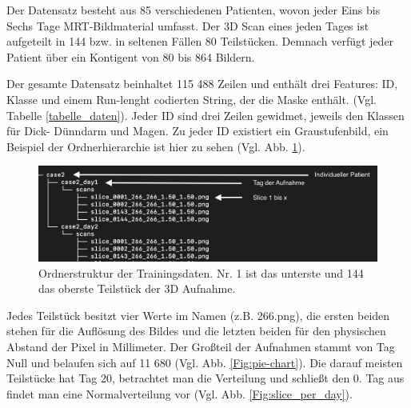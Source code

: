 Der Datensatz besteht aus 85 verschiedenen Patienten, wovon jeder Eins bis Sechs Tage MRT-Bildmaterial umfasst. Der 3D Scan eines jeden Tages ist aufgeteilt in 144  bzw. in seltenen Fällen 80 Teilstücken. Demnach verfügt jeder Patient über ein Kontigent von 80 bis 864 Bildern.

Der gesamte Datensatz beinhaltet 115 488 Zeilen und enthält drei Features: ID, Klasse und einem Run-lenght codierten String, der die Maske enthält. (Vgl. Tabelle \ref{tabelle_daten}). Jeder ID sind drei Zeilen gewidmet, jeweils den Klassen für Dick- Dünndarm und Magen. Zu jeder ID existiert ein Graustufenbild, ein Beispiel der Ordnerhierarchie ist hier zu sehen (Vgl. Abb. \ref{Fig:train-data}).

\begin{figure}[H]
	\begin{center}
		\includegraphics[width=350pt]{bilder/data_tree}
		\caption{Ordnerstruktur der Trainingsdaten. Nr. 1 ist das unterste und 144 das oberste Teilstück der 3D Aufnahme.}\label{Fig:train-data}
	\end{center}
\end{figure}

Jedes Teilstück besitzt vier Werte im Namen (z.B. 266.png), die ersten beiden stehen für die Auflösung des Bildes und die letzten beiden für den physischen Abstand der Pixel in Millimeter. Der Großteil der Aufnahmen stammt von Tag Null und belaufen sich auf 11 680 (Vgl. Abb. \ref{Fig:pie-chart}). Die darauf meisten Teilstücke hat Tag 20, betrachtet man die Verteilung und schließt den 0. Tag aus findet man eine Normalverteilung vor (Vgl. Abb. \ref{Fig:slice_per_day}).

